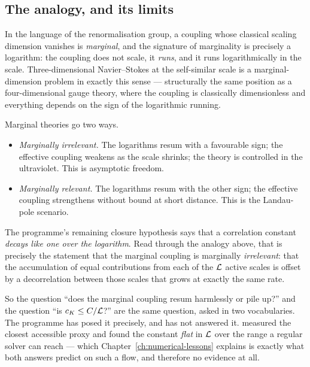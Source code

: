 \subsection{The analogy, and its limits}

In the language of the renormalisation group, a coupling whose classical
scaling dimension vanishes is \emph{marginal}, and the signature of
marginality is precisely a logarithm: the coupling does not scale, it
\emph{runs}, and it runs logarithmically in the scale. Three-dimensional
Navier--Stokes at the self-similar scale is a marginal-dimension problem in
exactly this sense --- structurally the same position as a four-dimensional
gauge theory, where the coupling is classically dimensionless and everything
depends on the sign of the logarithmic running.

Marginal theories go two ways.

\begin{itemize}[leftmargin=1.6em]
\item \emph{Marginally irrelevant.} The logarithms resum with a favourable
  sign; the effective coupling weakens as the scale shrinks; the theory is
  controlled in the ultraviolet. This is asymptotic freedom.
\item \emph{Marginally relevant.} The logarithms resum with the other sign;
  the effective coupling strengthens without bound at short distance. This is
  the Landau-pole scenario.
\end{itemize}

\begin{obsv}
\label{obs:ck-is-resummation}
The programme's remaining closure hypothesis says that a correlation constant
\emph{decays like one over the logarithm}. Read through the analogy above,
that is precisely the statement that the marginal coupling is marginally
\emph{irrelevant}: that the accumulation of equal contributions from each of
the \(\mathcal{L}\) active scales is offset by a decorrelation between those scales
that grows at exactly the same rate.

\smallskip
So the question ``does the marginal coupling resum harmlessly or pile up?''
and the question ``is \(c_K\le C/\mathcal{L}\)?'' are the same question, asked in
two vocabularies. The programme has posed it precisely, and has not answered
it.  measured the closest accessible proxy and found the constant
\emph{flat} in \(\mathcal{L}\) over the range a regular solver can reach --- which
Chapter~\ref{ch:numerical-lessons} explains is exactly what both answers
predict on such a flow, and therefore no evidence at all.
\end{obsv}

